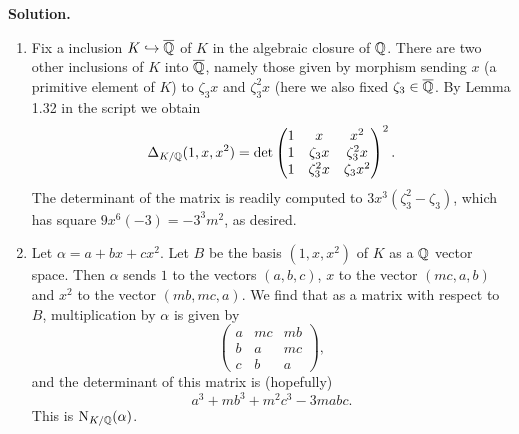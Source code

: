 \documentclass[a4paper,11pt]{article}
\begin{document}
\textbf{Solution.} 
\begin{enumerate}[wide, labelindent=0pt]
    \item Fix a inclusion $K \hookrightarrow \overline {\mathbb{Q}}$ of $K$ in the algebraic closure of $\mathbb{Q}$.
        There are two other inclusions of $K$ into $\overline {\mathbb{Q}}$, namely those given by
        morphism sending $x$ (a primitive element of $K$) to $\zeta_3 x$ and
        $\zeta_3^2 x$ (here we also fixed $\zeta_3 \in \overline {\mathbb{Q}}$. By Lemma
        1.32 in the script we obtain
        \begin{equation*}
            \Delta_{K/\mathbb{Q}}(1,x,x^2) = \det \begin{pmatrix}
                                            1 & x & x^2 \\
                                            1 & \zeta_3 x & \zeta_3^2 x \\
                                            1 & \zeta_3^2 x & \zeta_3 x^2
                                          \end{pmatrix}^2.
        \end{equation*}
        The determinant of the matrix is readily computed to $3x^3(\zeta_3^2 - 
        \zeta_3)$, which has square $9x^6(-3) = -3^3m^2$, as desired.

    \item Let $\alpha = a + bx + cx^2$. Let $B$ be the basis $(1,x,x^2)$ of $K$
        as a $\mathbb{Q}$ vector space. Then $\alpha$ sends $1$ to the vectors
        $(a,b,c)$, $x$ to the vector $(mc, a, b)$ and $x^2$ to the vector
        $(mb, mc, a)$. We find that as a matrix with respect to $B$, 
        multiplication by $\alpha$ is given by
        \begin{equation*}
            \begin{pmatrix} 
                a  & mc & mb \\
                b  & a  & mc  \\
                c  & b  & a
            \end{pmatrix},
        \end{equation*}
        and the determinant of this matrix is (hopefully)
        \begin{equation*}
            a^3 + mb^3 + m^2 c^3 - 3mabc.
        \end{equation*}
        This is $\operatorname{N}_{K/\mathbb{Q}}(\alpha)$.
\end{enumerate}
\end{document}
